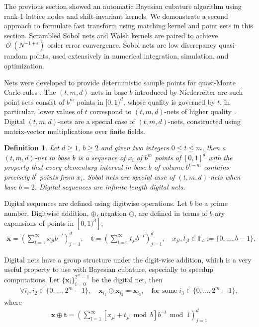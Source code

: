 \documentclass{iitthesis}          %
\DeclareMathOperator{\Order}{{\mathcal O}}
\newtheorem{defn}{Definition}
\newcommand{\bm}[1]{\boldsymbol{#1}}
\newcommand{\vt}{\bm{t}}
\newcommand{\vx}{\bm{x}}
\begin{document}
\label{sec:sobol_walsh}


The previous section showed an automatic Bayesian cubature algorithm using rank-1 lattice nodes and shift-invariant kernels. 
We demonstrate a second approach to formulate fast transform using matching kernel and point sets in this section. 
Scrambled Sobol nets and Walsh kernels are paired to achieve $\Order(N^{-1 + \epsilon})$  order error convergence. 
Sobol nets \cite{Sob67} are low discrepancy quasi-random points, used extensively in numerical integration, simulation, and optimization. 

Nets were developed to provide deterministic sample points for quasi-Monte Carlo rules \cite{Nie05a}.
The $(t,m, d)$-nets in base $b$ introduced by Niederreiter are such point sets consist of $b^m$ points in $[0, 1)^d$, whose quality is governed by $t$, in particular, lower values of $t$ correspond to $(t,m, d)$-nets of higher quality \cite{Bald10a}.
Digital $(t,m, d)$-nets are a special case of $(t,m, d)$-nets, constructed using matrix-vector multiplications over finite fields.

\begin{defn}
Let $d \ge 1$, $b\ge 2$ and given two integers $0 \le t \le m$, then a $(t,m,d)$-net in base $b$ is a sequence of $x_i$ of $b^m$ points of $[0,1]^d$  
with the property that every elementary interval in base $b$ of volume $b^{t-m}$ contains precisely $b^t$ points from $x_i$. Sobol nets are special case of $(t,m, d)$-nets when base $b=2$. Digital sequences are infinite length digital nets.
\end{defn}

Digital sequences are defined using digitwise operations. Let $b$ be a prime number. Digitwise addition, $\oplus$, negation $\ominus$, are defined in terms of $b$-ary expansions of points in $[0, 1)^d]$,
\begin{align*}
\vx = \left( \sum_{l=1}^{\infty} x_{jl}b^{-l}\right)_{j=1}^d, \quad
\vt = \left( \sum_{l=1}^{\infty} t_{jl}b^{-l}\right)_{j=1}^d, \quad
x_{jl}, t_{jl} \in \mathbb{F}_b := \{0,\dots,b-1\},
\end{align*}

Digital nets have a group structure under the digit-wise addition, which is a very useful property to use with Bayesian cubature, especially to speedup computations. 
Let $\{\vx_i\}_{i=0}^{2^m-1}$ be the digital net, then
\begin{align*}
\forall i_i, i_2 \in \{0,\dots,2^m-1\}, \quad \vx_{i_1} \oplus \vx_{i_2} = \vx_{i_3}, \quad \text{for some} \; i_3 \in \{0,\dots,2^m-1\},
\end{align*}
where
\begin{align*}
\vx \oplus \vt = \left( \sum_{l=1}^\infty [x_{jl} + t_{jl} \bmod b] b^{-l} \bmod 1 \right)_{j=1}^d
\end{align*}
\end{document}
